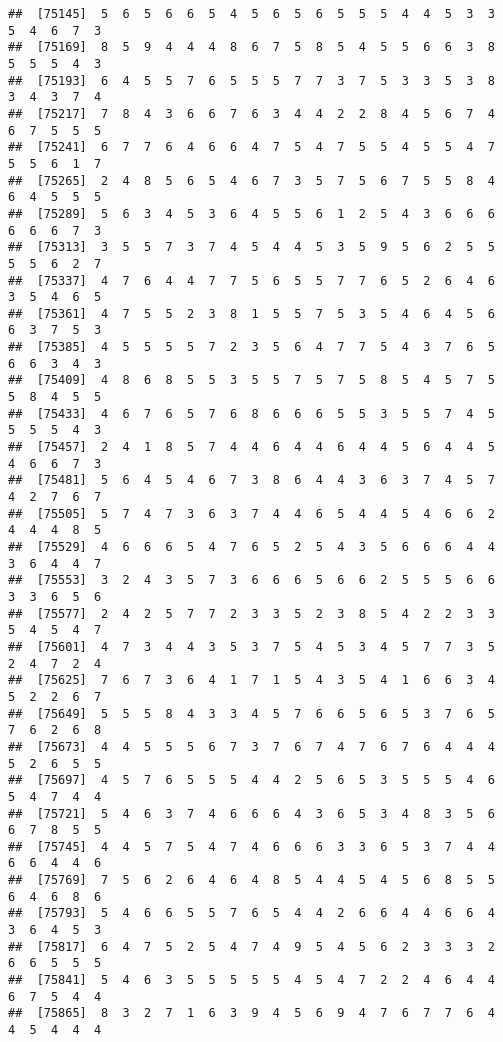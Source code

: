 \documentclass[
]{book}
\begin{document}
\begin{verbatim}
##  [75145]  5  6  5  6  6  5  4  5  6  5  6  5  5  5  4  4  5  3  3  5  4  6  7  3
##  [75169]  8  5  9  4  4  4  8  6  7  5  8  5  4  5  5  6  6  3  8  5  5  5  4  3
##  [75193]  6  4  5  5  7  6  5  5  5  7  7  3  7  5  3  3  5  3  8  3  4  3  7  4
##  [75217]  7  8  4  3  6  6  7  6  3  4  4  2  2  8  4  5  6  7  4  6  7  5  5  5
##  [75241]  6  7  7  6  4  6  6  4  7  5  4  7  5  5  4  5  5  4  7  5  5  6  1  7
##  [75265]  2  4  8  5  6  5  4  6  7  3  5  7  5  6  7  5  5  8  4  6  4  5  5  5
##  [75289]  5  6  3  4  5  3  6  4  5  5  6  1  2  5  4  3  6  6  6  6  6  6  7  3
##  [75313]  3  5  5  7  3  7  4  5  4  4  5  3  5  9  5  6  2  5  5  5  5  6  2  7
##  [75337]  4  7  6  4  4  7  7  5  6  5  5  7  7  6  5  2  6  4  6  3  5  4  6  5
##  [75361]  4  7  5  5  2  3  8  1  5  5  7  5  3  5  4  6  4  5  6  6  3  7  5  3
##  [75385]  4  5  5  5  5  7  2  3  5  6  4  7  7  5  4  3  7  6  5  6  6  3  4  3
##  [75409]  4  8  6  8  5  5  3  5  5  7  5  7  5  8  5  4  5  7  5  5  8  4  5  5
##  [75433]  4  6  7  6  5  7  6  8  6  6  6  5  5  3  5  5  7  4  5  5  5  5  4  3
##  [75457]  2  4  1  8  5  7  4  4  6  4  4  6  4  4  5  6  4  4  5  4  6  6  7  3
##  [75481]  5  6  4  5  4  6  7  3  8  6  4  4  3  6  3  7  4  5  7  4  2  7  6  7
##  [75505]  5  7  4  7  3  6  3  7  4  4  6  5  4  4  5  4  6  6  2  4  4  4  8  5
##  [75529]  4  6  6  6  5  4  7  6  5  2  5  4  3  5  6  6  6  4  4  3  6  4  4  7
##  [75553]  3  2  4  3  5  7  3  6  6  6  5  6  6  2  5  5  5  6  6  3  3  6  5  6
##  [75577]  2  4  2  5  7  7  2  3  3  5  2  3  8  5  4  2  2  3  3  5  4  5  4  7
##  [75601]  4  7  3  4  4  3  5  3  7  5  4  5  3  4  5  7  7  3  5  2  4  7  2  4
##  [75625]  7  6  7  3  6  4  1  7  1  5  4  3  5  4  1  6  6  3  4  5  2  2  6  7
##  [75649]  5  5  5  8  4  3  3  4  5  7  6  6  5  6  5  3  7  6  5  7  6  2  6  8
##  [75673]  4  4  5  5  5  6  7  3  7  6  7  4  7  6  7  6  4  4  4  5  2  6  5  5
##  [75697]  4  5  7  6  5  5  5  4  4  2  5  6  5  3  5  5  5  4  6  5  4  7  4  4
##  [75721]  5  4  6  3  7  4  6  6  6  4  3  6  5  3  4  8  3  5  6  6  7  8  5  5
##  [75745]  4  4  5  7  5  4  7  4  6  6  6  3  3  6  5  3  7  4  4  6  6  4  4  6
##  [75769]  7  5  6  2  6  4  6  4  8  5  4  4  5  4  5  6  8  5  5  6  4  6  8  6
##  [75793]  5  4  6  6  5  5  7  6  5  4  4  2  6  6  4  4  6  6  4  3  6  4  5  3
##  [75817]  6  4  7  5  2  5  4  7  4  9  5  4  5  6  2  3  3  3  2  6  6  5  5  5
##  [75841]  5  4  6  3  5  5  5  5  5  4  5  4  7  2  2  4  6  4  4  6  7  5  4  4
##  [75865]  8  3  2  7  1  6  3  9  4  5  6  9  4  7  6  7  7  6  4  4  5  4  4  4

\end{verbatim}
\end{document}

